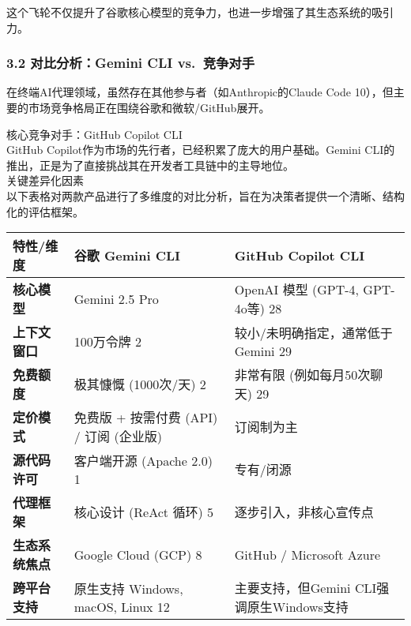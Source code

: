 \documentclass[a4paper,12pt]{article}
\begin{document}
\begin{multicols}{2}
    这个飞轮不仅提升了谷歌核心模型的竞争力，也进一步增强了其生态系统的吸引力。

    \subsubsection{\texorpdfstring{\textbf{3.2 对比分析：Gemini CLI
    vs.~竞争对手}}{3.2 对比分析：Gemini CLI vs.~竞争对手}}\label{ux5bf9ux6bd4ux5206ux6790gemini-cli-vs.-ux7adeux4e89ux5bf9ux624b}

    在终端AI代理领域，虽然存在其他参与者（如Anthropic的Claude Code
    10），但主要的市场竞争格局正在围绕谷歌和微软/GitHub展开。

    核心竞争对手：GitHub Copilot CLI\\
    GitHub Copilot作为市场的先行者，已经积累了庞大的用户基础。Gemini
    CLI的推出，正是为了直接挑战其在开发者工具链中的主导地位。\\
    关键差异化因素\\
    以下表格对两款产品进行了多维度的对比分析，旨在为决策者提供一个清晰、结构化的评估框架。

    \begin{longtable}[]{@{}
      >{\raggedright\arraybackslash}p{}
      >{\raggedright\arraybackslash}p{}
      >{\raggedright\arraybackslash}p{}@{}}
    \toprule\noalign{}
    \begin{minipage}[b]{\linewidth}\raggedright
    特性/维度
    \end{minipage} & \begin{minipage}[b]{\linewidth}\raggedright
    谷歌 Gemini CLI
    \end{minipage} & \begin{minipage}[b]{\linewidth}\raggedright
    GitHub Copilot CLI
    \end{minipage} \\
    \midrule\noalign{}
    \endhead
    \bottomrule\noalign{}
    \endlastfoot
    \textbf{核心模型} & Gemini 2.5 Pro & OpenAI 模型 (GPT-4, GPT-4o等)
    28 \\
    \textbf{上下文窗口} & 100万令牌 2 & 较小/未明确指定，通常低于Gemini
    29 \\
    \textbf{免费额度} & 极其慷慨 (1000次/天) 2 & 非常有限
    (例如每月50次聊天) 29 \\
    \textbf{定价模式} & 免费版 + 按需付费 (API) / 订阅 (企业版) &
    订阅制为主 \\
    \textbf{源代码许可} & 客户端开源 (Apache 2.0) 1 & 专有/闭源 \\
    \textbf{代理框架} & 核心设计 (ReAct 循环) 5 &
    逐步引入，非核心宣传点 \\
    \textbf{生态系统焦点} & Google Cloud (GCP) 8 & GitHub / Microsoft
    Azure \\
    \textbf{跨平台支持} & 原生支持 Windows, macOS, Linux 12 &
    主要支持，但Gemini CLI强调原生Windows支持 \\
    \end{longtable}


\end{multicols}
\end{document}
